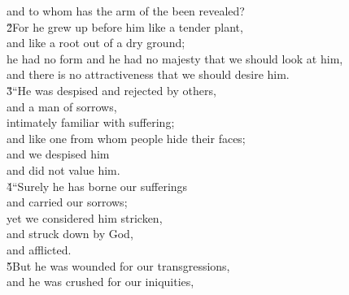 \begin{poetry}
\poemll    and to whom has the arm of the  been revealed? \\
\poeml \v{2}For he grew up before him like a tender plant, \\
\poemll    and like a root out of a dry ground; \\
\poeml he had no form and he had no majesty that we should look at him, \\
\poemll    and there is no attractiveness that we should desire him. \\
\poeml \v{3}``He was despised and rejected by others, \\
\poemll    and a man of sorrows, \\
\poemlll       intimately familiar with suffering; \\
\poeml and like one from whom people hide their faces; \\
\poemll    and we despised him \\
\poemlll       and did not value him. \\
\poeml \v{4}``Surely he has borne our sufferings \\
\poemll    and carried our sorrows; \\
\poeml yet we considered him stricken, \\
\poemll    and struck down by God, \\
\poemlll       and afflicted. \\
\poeml \v{5}But he was wounded for our transgressions, \\
\poemll    and he was crushed for our iniquities, \\

\end{poetry}
